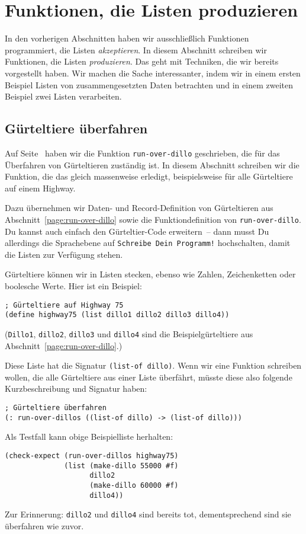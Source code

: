 \section{Funktionen, die Listen produzieren}

%
In den vorherigen Abschnitten haben wir ausschließlich Funktionen
programmiert, die Listen \emph{akzeptieren}.  In diesem Abschnitt
schreiben wir Funktionen, die Listen \emph{produzieren}.  Das geht mit
Techniken, die wir bereits vorgestellt haben.  Wir machen die Sache
interessanter, indem wir in einem ersten Beispiel Listen von
zusammengesetzten Daten betrachten und in einem zweiten Beispiel zwei
Listen verarbeiten.

\subsection{Gürteltiere überfahren}

Auf Seite~\pageref{page:run-over-dillo} haben wir die Funktion
\texttt{run-over-dillo} geschrieben, die für das Überfahren von
Gürteltieren zuständig ist.  In diesem Abschnitt schreiben wir die
Funktion, die das gleich massenweise erledigt, beispielsweise für alle
Gürteltiere auf einem Highway.

Dazu übernehmen wir Daten- und Record-Definition von Gürteltieren aus
Abschnitt~\ref{page:run-over-dillo} sowie die Funktiondefinition von
\lstinline{run-over-dillo}.  Du kannst auch einfach den Gürteltier-Code
erweitern~-- dann musst Du allerdings die Sprachebene auf
\texttt{Schreibe Dein Programm!} hochschalten, damit die Listen zur
Verfügung stehen.

Gürteltiere können wir in Listen stecken, ebenso wie Zahlen,
Zeichenketten oder boolesche Werte.  Hier ist ein Beispiel:
%
\begin{lstlisting}
; Gürteltiere auf Highway 75
(define highway75 (list dillo1 dillo2 dillo3 dillo4))
\end{lstlisting}
(\lstinline{Dillo1}, \lstinline{dillo2}, \lstinline{dillo3} und \lstinline{dillo4} sind die
Beispielgürteltiere aus Abschnitt~\ref{page:run-over-dillo}.)

Diese Liste hat die Signatur \lstinline{(list-of dillo)}.  Wenn wir eine
Funktion schreiben wollen, die alle Gürteltiere aus einer Liste
überfährt, müsste diese also folgende Kurzbeschreibung und Signatur
haben:
%
\begin{lstlisting}
; Gürteltiere überfahren
(: run-over-dillos ((list-of dillo) -> (list-of dillo)))
\end{lstlisting}
%
Als Testfall kann obige Beispielliste herhalten:
%
\begin{lstlisting}
(check-expect (run-over-dillos highway75)
              (list (make-dillo 55000 #f)
                    dillo2
                    (make-dillo 60000 #f)
                    dillo4))
\end{lstlisting}
%
Zur Erinnerung: \lstinline{dillo2} und \lstinline{dillo4} sind bereits tot,
dementsprechend sind sie überfahren wie zuvor.

